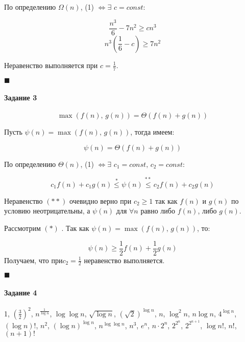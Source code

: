 \documentclass{article}
\begin{document}
  По определению $\Omega(n)$, (1) $\Leftrightarrow \exists$ $c = const:$

  $$ \frac{n^3}{6} - 7n^2 \geq c n^3 $$
  $$ n^3(\frac{1}{6} - c) \geq 7n^2 $$

  Неравенство выполняется при $ c = \frac{1}{7} $.
  \begin{flushright}
    $\blacksquare$
  \end{flushright} 

  \paragraph{Задание 3}
  \setcounter{equation}{0}

  \begin{equation*}
    \max(f(n), \, g(n)) = \Theta(f(n) + g(n))
  \end{equation*}

  Пусть $\psi(n) = \max(f(n), \, g(n))$, тогда имеем:

  \begin{equation}
    \psi(n) = \Theta(f(n) + g(n))
  \end{equation}

  По определению $\Theta(n)$, (1) $\Leftrightarrow \exists$ $c_{1} = const, \, c_{2} = const:$

  \begin{equation*}
    c_{1}f(n) + c_{1}g(n) \overset{*}{\le} \psi(n) \overset{**}{\le} c_{2} f(n) + c_{2}g(n)
  \end{equation*}

  Неравенство $(**)$ очевидно верно при $c_{2} \geq 1$ так как $f(n)$ и $g(n)$ по условию неотрицательны, а $\psi(n)$ для $\forall n$ равно либо $f(n)$, либо $g(n)$.

  Рассмотрим $(*)$	. Так как $\psi(n) = \max(f(n), \, g(n))$, то:

  $$\psi(n) \geq \frac{1}{2} f(n) + \frac{1}{2} g(n)$$
  Получаем, что $при c_{2} = \frac{1}{2}$ неравенство выполняется.

  \begin{flushright}
    $\blacksquare$
  \end{flushright} 

  \paragraph{Задание 4}
  \setcounter{equation}{0} 
  $$ $$
  1, $(\frac{3}{2})^2$, $n^{\frac{1}{\log{n}}}$, $\log{\log{n}}$, $\sqrt{\log{n}}$, $(\sqrt{2})^{\log{n}}$, $n$, $\log^2{n}$, $n \log{n}$, $4^{\log{n}}$, $(\log{n})!$, $n^2$, $(\log{n})^{\log{n}}$, $n^{\log{\log{n}}}$, $n^3$, $e^{n}$, $n \cdot 2^{n}$, $2^{2^n}$, $2^{2^{n + 1}}$, $\log{n!}$, $n!$, $(n + 1)!$
\end{document}
